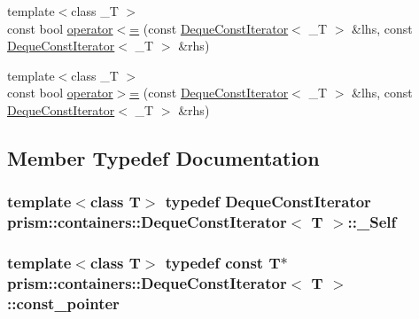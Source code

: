 \begin{DoxyCompactItemize}
\item 
{\footnotesize template$<$class \+\_\+T $>$ }\\const bool \hyperlink{classprism_1_1containers_1_1_deque_const_iterator_aaf85ae142a8d535fbd834628a1b6ac75}{operator$<$=} (const \hyperlink{classprism_1_1containers_1_1_deque_const_iterator}{Deque\+Const\+Iterator}$<$ \+\_\+T $>$ \&lhs, const \hyperlink{classprism_1_1containers_1_1_deque_const_iterator}{Deque\+Const\+Iterator}$<$ \+\_\+T $>$ \&rhs)
\item 
{\footnotesize template$<$class \+\_\+T $>$ }\\const bool \hyperlink{classprism_1_1containers_1_1_deque_const_iterator_a338702312615cb1577f6c1e0ff186764}{operator$>$=} (const \hyperlink{classprism_1_1containers_1_1_deque_const_iterator}{Deque\+Const\+Iterator}$<$ \+\_\+T $>$ \&lhs, const \hyperlink{classprism_1_1containers_1_1_deque_const_iterator}{Deque\+Const\+Iterator}$<$ \+\_\+T $>$ \&rhs)
\end{DoxyCompactItemize}


\subsection{Member Typedef Documentation}
\subsubsection[{\texorpdfstring{\+\_\+\+Self}{_Self}}]{\setlength{\rightskip}{0pt plus 5cm}template$<$class T$>$ typedef {\bf Deque\+Const\+Iterator} {\bf prism\+::containers\+::\+Deque\+Const\+Iterator}$<$ T $>$\+::{\bf \+\_\+\+Self}}\hypertarget{classprism_1_1containers_1_1_deque_const_iterator_a5337ff83b02dad8f93642f44af581941}{}\label{classprism_1_1containers_1_1_deque_const_iterator_a5337ff83b02dad8f93642f44af581941}
\subsubsection[{\texorpdfstring{const\+\_\+pointer}{const_pointer}}]{\setlength{\rightskip}{0pt plus 5cm}template$<$class T$>$ typedef const T$\ast$ {\bf prism\+::containers\+::\+Deque\+Const\+Iterator}$<$ T $>$\+::{\bf const\+\_\+pointer}}\hypertarget{classprism_1_1containers_1_1_deque_const_iterator_aeee46255ac509f1b2cbe6b70a12e031a}{}\label{classprism_1_1containers_1_1_deque_const_iterator_aeee46255ac509f1b2cbe6b70a12e031a}
